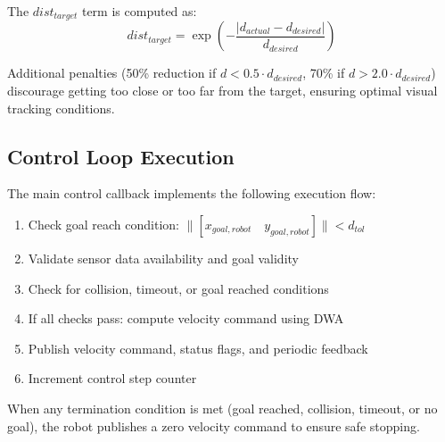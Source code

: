 The $dist_{target}$ term is computed as:
\begin{equation}
    dist_{target} = \exp\left(-\frac{|d_{actual} - d_{desired}|}{d_{desired}}\right)
\end{equation}

Additional penalties (50\% reduction if $d < 0.5 \cdot d_{desired}$, 70\% if $d > 2.0 \cdot d_{desired}$) discourage getting too close or too far from the target, ensuring optimal visual tracking conditions.

\subsection{Control Loop Execution}

The main control callback implements the following execution flow:

\begin{enumerate}
    \item Check goal reach condition: $\|[x_{goal,robot} \quad y_{goal,robot}]\| < d_{tol}$
    \item Validate sensor data availability and goal validity
    \item Check for collision, timeout, or goal reached conditions
    \item If all checks pass: compute velocity command using DWA
    \item Publish velocity command, status flags, and periodic feedback
    \item Increment control step counter
\end{enumerate}

When any termination condition is met (goal reached, collision, timeout, or no goal), the robot publishes a zero velocity command to ensure safe stopping.

